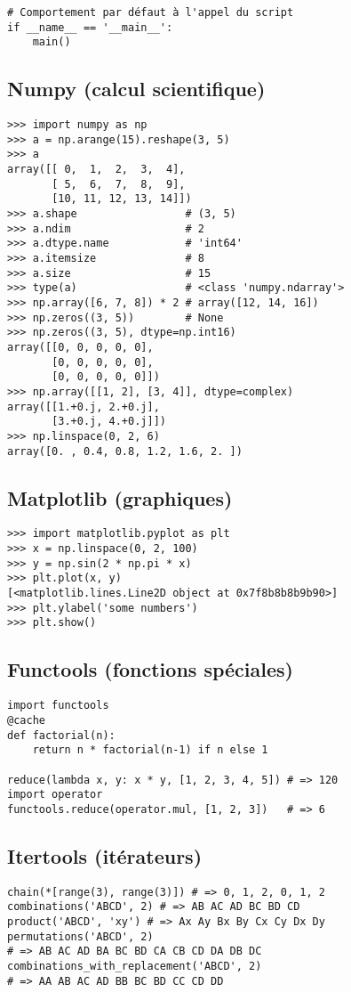 \documentclass{article}
\begin{document}
\begin{multicols*}{4}
\begin{lstlisting}
# Comportement par défaut à l'appel du script
if __name__ == '__main__':
    main()
\end{lstlisting}

\subsection*{Numpy (calcul scientifique)}
\begin{lstlisting}
>>> import numpy as np
>>> a = np.arange(15).reshape(3, 5)
>>> a
array([[ 0,  1,  2,  3,  4],
       [ 5,  6,  7,  8,  9],
       [10, 11, 12, 13, 14]])
>>> a.shape                 # (3, 5)
>>> a.ndim                  # 2
>>> a.dtype.name            # 'int64'
>>> a.itemsize              # 8
>>> a.size                  # 15
>>> type(a)                 # <class 'numpy.ndarray'>
>>> np.array([6, 7, 8]) * 2 # array([12, 14, 16])
>>> np.zeros((3, 5))        # None
>>> np.zeros((3, 5), dtype=np.int16)
array([[0, 0, 0, 0, 0],
       [0, 0, 0, 0, 0],
       [0, 0, 0, 0, 0]])
>>> np.array([[1, 2], [3, 4]], dtype=complex)
array([[1.+0.j, 2.+0.j],
       [3.+0.j, 4.+0.j]])
>>> np.linspace(0, 2, 6)
array([0. , 0.4, 0.8, 1.2, 1.6, 2. ])\end{lstlisting}

\subsection*{Matplotlib (graphiques)}
\begin{lstlisting}
>>> import matplotlib.pyplot as plt
>>> x = np.linspace(0, 2, 100)
>>> y = np.sin(2 * np.pi * x)
>>> plt.plot(x, y)
[<matplotlib.lines.Line2D object at 0x7f8b8b8b9b90>]
>>> plt.ylabel('some numbers')
>>> plt.show()\end{lstlisting}

\subsection*{Functools (fonctions spéciales)}
\begin{lstlisting}
import functools
@cache
def factorial(n):
    return n * factorial(n-1) if n else 1

reduce(lambda x, y: x * y, [1, 2, 3, 4, 5]) # => 120
import operator
functools.reduce(operator.mul, [1, 2, 3])   # => 6\end{lstlisting}

\subsection*{Itertools (itérateurs)}
\begin{lstlisting}
chain(*[range(3), range(3)]) # => 0, 1, 2, 0, 1, 2
combinations('ABCD', 2) # => AB AC AD BC BD CD
product('ABCD', 'xy') # => Ax Ay Bx By Cx Cy Dx Dy
permutations('ABCD', 2)
# => AB AC AD BA BC BD CA CB CD DA DB DC
combinations_with_replacement('ABCD', 2)
# => AA AB AC AD BB BC BD CC CD DD\end{lstlisting}


\end{multicols*}
\end{document}
